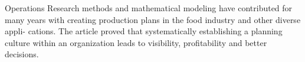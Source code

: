 \documentclass[a4paper,12pt]{article}
\begin{document}
Operations Research methods and mathematical modeling have contributed for many years with creating production plans in the food industry and other diverse appli- cations. The article proved that systematically establishing a planning culture within an organization leads to visibility, profitability and better decisions.


\printbibliography
\end{document}
